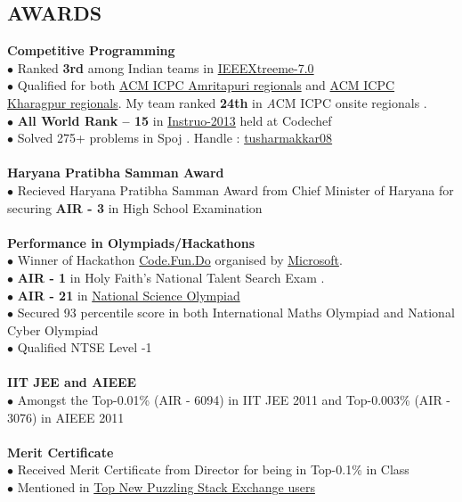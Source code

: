 \documentclass[margin,line]{resume}
\begin{document}
\begin{resume}
  \section{\mysidestyle \bf AWARDS} 
  {\bf Competitive Programming } 
 \\$\bullet$ Ranked {\bfseries 3rd} among Indian teams in \href{http://www.ieee.org/membership_services/membership/students/competitions/xtreme/index.html}{IEEEXtreeme-7.0}
\\$\bullet$ Qualified for both \href{icpc.amrita.ac.in}{ACM ICPC Amritapuri regionals} and \href{http://acm.iitkgp.ac.in/}{ACM ICPC Kharagpur regionals}. My team ranked {\bfseries 24th} in {\emph ACM ICPC onsite regionals} .
    \\$\bullet$ {\bfseries All World Rank – 15} in \href{http://www.codechef.com/rankings/INST2013/}{Instruo-2013} held at Codechef 
\\$\bullet$ Solved 275+ problems in Spoj . Handle :  \href{http://www.spoj.com/users/tusharmakkar08/}{tusharmakkar08}
\\\\    {\bf Haryana Pratibha Samman Award   }
     \\$\bullet$ Recieved Haryana Pratibha Samman Award from Chief Minister of Haryana for securing {\bfseries AIR - 3} in High School Examination
\\\\ {\bf Performance in Olympiads/Hackathons } 
     \\$\bullet$ Winner of Hackathon \href{https://www.acadaccelerator.com/Home/Events}{Code.Fun.Do} organised by \href{http://www.microsoft.com/en-in/msidc/default.aspx}{Microsoft}.
\\$\bullet$ {\bfseries AIR - 1} in Holy Faith's National Talent Search Exam .
    \\$\bullet$ {\bfseries AIR - 21} in \href{http://www.sofworld.org/nso}{National Science Olympiad} 
    \\$\bullet$ Secured 93 percentile score in both International Maths Olympiad and National Cyber Olympiad
\\$\bullet$ Qualified NTSE Level -1
    \\ \\  {\bf IIT JEE and AIEEE  } 
     \\$\bullet$ Amongst the  Top-0.01\% (AIR - 6094) in IIT JEE 2011 and Top-0.003\% (AIR - 3076) in AIEEE 2011
\\\\ {\bf Merit Certificate} 
     \\$\bullet$ Received Merit Certificate from Director for being in Top-0.1\% in Class
     \\$\bullet$ Mentioned in \href{http://stackexchange.com/leagues/307/week/puzzling/2015-03-09}{Top New Puzzling Stack Exchange users}





\end{resume}
\end{document}

